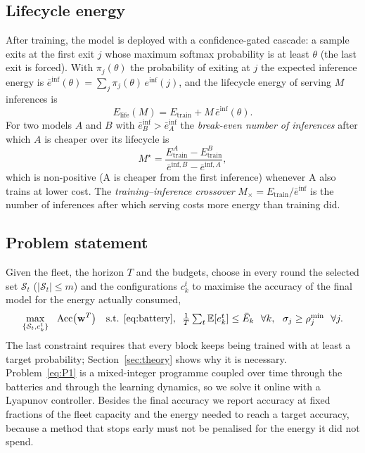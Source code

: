 \subsection{Lifecycle energy}\label{sec:lifecycle-model}
After training, the model is deployed with a confidence-gated cascade: a sample exits at the first exit $j$ whose maximum softmax probability is at least $\theta$ (the last exit is forced). With $\pi_j(\theta)$ the probability of exiting at $j$ the expected inference energy is $\bar e^{\mathrm{inf}}(\theta)=\sum_j\pi_j(\theta)\,e^{\mathrm{inf}}(j)$, and the lifecycle energy of serving $M$ inferences is
\begin{equation}\label{eq:lifecycle}
E_{\mathrm{life}}(M)=E_{\mathrm{train}}+M\,\bar e^{\mathrm{inf}}(\theta).
\end{equation}
For two models $A$ and $B$ with $\bar e^{\mathrm{inf}}_B>\bar e^{\mathrm{inf}}_A$ the \emph{break-even number of inferences} after which $A$ is cheaper over its lifecycle is
\begin{equation}\label{eq:breakeven}
M^\star=\frac{E^{A}_{\mathrm{train}}-E^{B}_{\mathrm{train}}}{\bar e^{\mathrm{inf},B}-\bar e^{\mathrm{inf},A}},
\end{equation}
which is non-positive (A is cheaper from the first inference) whenever A also trains at lower cost. The \emph{training--inference crossover} $M_\times=E_{\mathrm{train}}/\bar e^{\mathrm{inf}}$ is the number of inferences after which serving costs more energy than training did.

\subsection{Problem statement}
Given the fleet, the horizon $T$ and the budgets, choose in every round the selected set $\mathcal S_t$ ($|\mathcal S_t|\le m$) and the configurations $c_k^t$ to maximise the accuracy of the final model for the energy actually consumed,
\begin{equation}\label{eq:P1}
\max_{\{\mathcal S_t,c_k^t\}}\ \ \mathrm{Acc}\big(\mathbf w^{T}\big)\quad\text{s.t. \eqref{eq:battery},}\ \ \tfrac1T\textstyle\sum_t\mathbb E[e_k^t]\le\bar E_k\ \ \forall k,\ \ \sigma_j\ge\rho^{\min}_j\ \ \forall j .
\end{equation}
The last constraint requires that every block keeps being trained with at least a target probability; Section~\ref{sec:theory} shows why it is necessary. Problem~\eqref{eq:P1} is a mixed-integer programme coupled over time through the batteries and through the learning dynamics, so we solve it online with a Lyapunov controller. Besides the final accuracy we report accuracy at fixed fractions of the fleet capacity and the energy needed to reach a target accuracy, because a method that stops early must not be penalised for the energy it did not spend.
